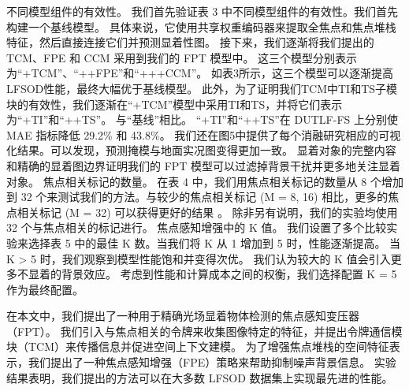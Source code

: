 不同模型组件的有效性。 我们首先验证表 3 中不同模型组件的有效性。我们首先构建一个基线模型。 具体来说，它使用共享权重编码器来提取全焦点和焦点堆栈特征，然后直接连接它们并预测显着性图。 接下来，我们逐渐将我们提出的 TCM、FPE 和 CCM 采用到我们的 FPT 模型中。 这三个模型分别表示为“+TCM”、“++FPE”和“+++CCM”。 如表3所示，这三个模型可以逐渐提高LFSOD性能，最终大幅优于基线模型。 此外，为了证明我们TCM中TI和TS子模块的有效性，我们逐渐在“+TCM”模型中采用TI和TS，并将它们表示为“+TI”和“++TS”。 与“基线”相比。 “+TI”和“++TS”在 DUTLF-FS 上分别使 MAE 指标降低 29.2\% 和 43.8\%。 我们还在图5中提供了每个消融研究相应的可视化结果。可以发现，预测掩模与地面实况图变得更加一致。 显着对象的完整内容和精确的显着图边界证明我们的 FPT 模型可以过滤掉背景干扰并更多地关注显着对象。 焦点相关标记的数量。 在表 4 中，我们用焦点相关标记的数量从 8 个增加到 32 个来测试我们的方法。与较少的焦点相关标记 (M = 8, 16) 相比，更多的焦点相关标记 (M = 32) 可以获得更好的结果 。 除非另有说明，我们的实验均使用 32 个与焦点相关的标记进行。 焦点感知增强中的 K 值。 我们设置了多个比较实验来选择表 5 中的最佳 K 数。当我们将 K 从 1 增加到 5 时，性能逐渐提高。 当 K > 5 时，我们观察到模型性能饱和并变得次优。 我们认为较大的 K 值会引入更多不显着的背景效应。 考虑到性能和计算成本之间的权衡，我们选择配置 K = 5 作为最终配置。

在本文中，我们提出了一种用于精确光场显着物体检测的焦点感知变压器（FPT）。 我们引入与焦点相关的令牌来收集图像特定的特征，并提出令牌通信模块（TCM）来传播信息并促进空间上下文建模。 为了增强焦点堆栈的空间特征表示，我们提出了一种焦点感知增强（FPE）策略来帮助抑制噪声背景信息。 实验结果表明，我们提出的方法可以在大多数 LFSOD 数据集上实现最先进的性能。


